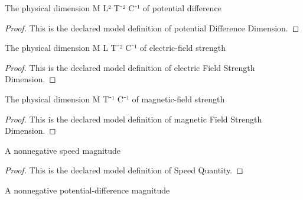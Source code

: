 \begin{definition}
  \label{def:physics:phyx-mini-0496:phyxminiproblems-problemphyxmini0496-potentialdifferencedimension}
  The physical dimension M L² T⁻² C⁻¹ of potential difference
\end{definition}
\begin{proof}
  This is the declared model definition of potential Difference Dimension.
\end{proof}
\begin{definition}
  \label{def:physics:phyx-mini-0496:phyxminiproblems-problemphyxmini0496-electricfieldstrengthdimension}
  The physical dimension M L T⁻² C⁻¹ of electric-field strength
\end{definition}
\begin{proof}
  This is the declared model definition of electric Field Strength Dimension.
\end{proof}
\begin{definition}
  \label{def:physics:phyx-mini-0496:phyxminiproblems-problemphyxmini0496-magneticfieldstrengthdimension}
  The physical dimension M T⁻¹ C⁻¹ of magnetic-field strength
\end{definition}
\begin{proof}
  This is the declared model definition of magnetic Field Strength Dimension.
\end{proof}
\begin{definition}
  \label{def:physics:phyx-mini-0496:phyxminiproblems-problemphyxmini0496-speedquantity}
  A nonnegative speed magnitude
\end{definition}
\begin{proof}
  This is the declared model definition of Speed Quantity.
\end{proof}
\begin{definition}
  \label{def:physics:phyx-mini-0496:phyxminiproblems-problemphyxmini0496-potentialdifferencequantity}
  A nonnegative potential-difference magnitude
\end{definition}
